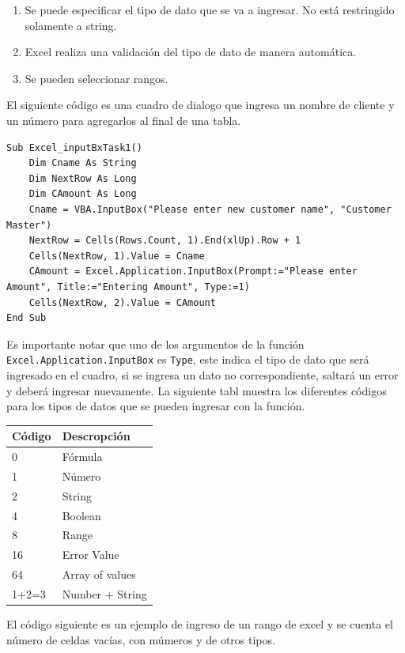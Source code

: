 \begin{enumerate}
    \item Se puede especificar el tipo de dato que se va a ingresar. No está restringido solamente a string.
    \item Excel realiza una validación del tipo de dato de manera automática.
    \item Se pueden seleccionar rangos.
\end{enumerate}

El siguiente código es una cuadro de dialogo que ingresa un nombre de cliente y un número para agregarlos al final de una tabla.

\begin{verbatim}
Sub Excel_inputBxTask1()
    Dim Cname As String
    Dim NextRow As Long
    Dim CAmount As Long
    Cname = VBA.InputBox("Please enter new customer name", "Customer Master")
    NextRow = Cells(Rows.Count, 1).End(xlUp).Row + 1
    Cells(NextRow, 1).Value = Cname
    CAmount = Excel.Application.InputBox(Prompt:="Please enter Amount", Title:="Entering Amount", Type:=1)
    Cells(NextRow, 2).Value = CAmount
End Sub
\end{verbatim}

Es importante notar que uno de los argumentos de la función \texttt{Excel.Application.InputBox} es \texttt{Type}, este indica el tipo de dato que será ingresado en el cuadro, si se ingresa un dato no correspondiente, saltará un error y deberá ingresar nuevamente. La siguiente tabl muestra los diferentes códigos para los tipos de datos que se pueden ingresar con la función.

\begin{table}[H]
    \centering
    \begin{tabular}{l|l}
        \rowcolor{micolor1} Código & Descropción \\ \hline
        0 & Fórmula \\
        1 & Número \\
        2 & String \\
        4 & Boolean \\
        8 & Range \\
        16 & Error Value \\
        64 & Array of values \\
        1+2=3 & Number + String \\
    \end{tabular}
\end{table}


 El código siguiente es un ejemplo de ingreso de un rango de excel y se cuenta el número de celdas vacías, con múmeros y de otros tipos.
 
